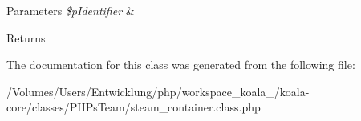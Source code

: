 \begin{DoxyParams}{Parameters}
{\em \$pIdentifier} & \\
\hline
\end{DoxyParams}
\begin{DoxyReturn}{Returns}

\end{DoxyReturn}


The documentation for this class was generated from the following file:\begin{DoxyCompactItemize}
\item 
/Volumes/Users/Entwicklung/php/workspace\_\-koala\_/koala-\/core/classes/PHPsTeam/steam\_\-container.class.php\end{DoxyCompactItemize}
